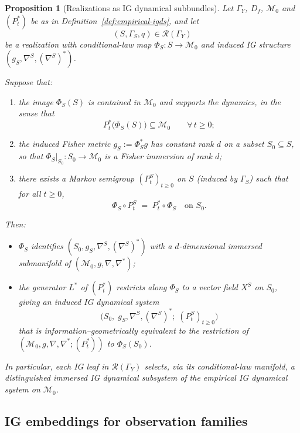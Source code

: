 \documentclass[11pt]{article}
\newtheorem{proposition}{Proposition}
\newcommand{\Mcal}{\mathcal{M}}
\begin{document}
\begin{proposition}[Realizations as IG dynamical subbundles]
\label{prop:realizations-as-sub-bundles}
Let $\Gamma_Y$, $D_f$, $\Mcal_0$ and $(P_t^\ast)$ be as in
Definition~\ref{def:empirical-igds}, and let
\[
  (S,\Gamma_S,q) \in \mathcal{R}(\Gamma_Y)
\]
be a realization with conditional-law map
$\Phi_S : S \to \Mcal_0$ and induced IG structure
$(g_S,\nabla^S,(\nabla^S)^\ast)$.

Suppose that:
\begin{enumerate}[label=(R\arabic*),leftmargin=1.8em]
  \item the image $\Phi_S(S)$ is contained in $\Mcal_0$ and supports the
  dynamics, in the sense that
  \[
    P_t^\ast\bigl(\Phi_S(S)\bigr) \subseteq \Mcal_0
    \qquad \forall\,t\ge 0;
  \]
  \item the induced Fisher metric $g_S := \Phi_S^\ast g$ has constant
  rank $d$ on a subset $S_0\subseteq S$, so that
  $\Phi_S|_{S_0}:S_0\to\Mcal_0$ is a Fisher immersion of rank $d$;
  \item there exists a Markov semigroup $(P_t^S)_{t\ge 0}$ on $S$
  (induced by $\Gamma_S$) such that for all $t\ge 0$,
  \[
    \Phi_S \circ P_t^S
    \;=\;
    P_t^\ast \circ \Phi_S
    \quad\text{on } S_0.
  \]
\end{enumerate}
Then:
\begin{itemize}[leftmargin=1.6em]
  \item $\Phi_S$ identifies $(S_0,g_S,\nabla^S,(\nabla^S)^\ast)$ with a
  $d$-dimensional immersed submanifold of
  $(\Mcal_0,g,\nabla,\nabla^\ast)$;
  \item the generator $L^\ast$ of $(P_t^\ast)$ restricts along $\Phi_S$
  to a vector field $X^S$ on $S_0$, giving an induced IG dynamical
  system
  \[
    \bigl(S_0,\; g_S,\nabla^S,(\nabla^S)^\ast;\; (P_t^S)_{t\ge 0}\bigr)
  \]
  that is information--geometrically equivalent to the restriction of
  $(\Mcal_0,g,\nabla,\nabla^\ast;(P_t^\ast))$ to $\Phi_S(S_0)$.
\end{itemize}

In particular, each IG leaf in $\mathcal{R}(\Gamma_Y)$ selects, via its
conditional-law manifold, a distinguished immersed IG dynamical
subsystem of the empirical IG dynamical system on $\Mcal_0$.
\end{proposition}

\subsection{IG embeddings for observation families}
\label{subsec:ig-observation-embeddings}
\end{document}
